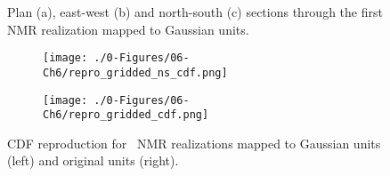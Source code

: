 \begin{figure}
    \centering
    \tabskip=0pt
    \caption{Plan (a), east-west (b) and north-south (c) sections through the first \gls{NMR} realization mapped to Gaussian units.}
    \label{fig:ns_reals}
\end{figure}

\begin{figure}
    \begin{subfigure}{0.5\textwidth}
        \centering
        \texttt{[image: ./0-Figures/06-Ch6/repro\_gridded\_ns\_cdf.png]}
    \end{subfigure}
    \begin{subfigure}{0.5\textwidth}
        \centering
        \texttt{[image: ./0-Figures/06-Ch6/repro\_gridded\_cdf.png]}
    \end{subfigure}
    \caption{\gls{CDF} reproduction for \csnreals \ \gls{NMR} realizations mapped to Gaussian units (left) and original units (right).}
    \label{fig:repro_gridded_cdfs}
\end{figure}


